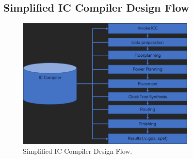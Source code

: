 \documentclass[a4paper,12pt,twoside]{article}
\begin{document}
\subsection{Simplified IC Compiler Design Flow}\label{SICCFlow}
\begin{figure}[H]
    \centering
    \includegraphics[width=0.8\textwidth]{images/2.png}
    \caption{Simplified IC Compiler Design Flow.}
\end{figure}
\end{document}
